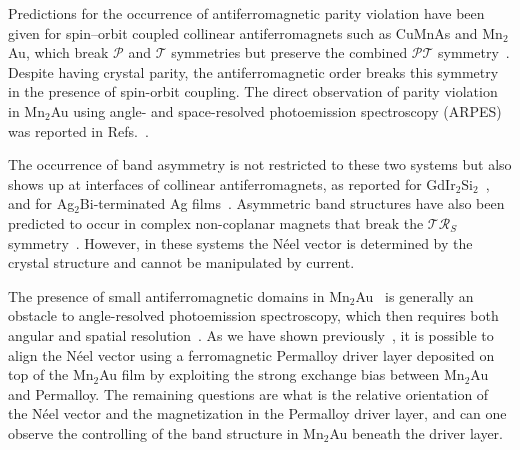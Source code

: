 \documentclass[aps,prb,twocolumn,superscriptaddress,10pt]{revtex4-1}
\begin{document}
Predictions for the occurrence of antiferromagnetic parity violation 
have been given for spin–orbit coupled collinear antiferromagnets such as CuMnAs and Mn$_2$Au, which break $\mathcal{P}$ and $\mathcal{T}$ symmetries but preserve the combined $\mathcal{PT}$ 
symmetry~\cite{Smejkal2017,Hayami2018,Watanabe2020,Elmers2020,Hayami2020}. 
Despite having crystal parity, the antiferromagnetic order
breaks this symmetry in the presence of spin-orbit coupling.
The direct observation of parity violation in Mn$_2$Au using 
angle- and space-resolved photoemission spectroscopy (ARPES) was reported in Refs.~.

The occurrence of band asymmetry is not restricted to these two systems but also
shows up at interfaces of collinear antiferromagnets, as reported for  GdIr$_2$Si$_2$~\cite{Schulz2021}, and for Ag$_2$Bi-terminated Ag films~\cite{Carbone2016}. 
Asymmetric band structures have also been predicted to occur in complex non-coplanar magnets that break the $\mathcal{TR}_{S}$ symmetry~\cite{Hayami2018}.
However, in these systems the N{\'e}el vector is determined by the crystal structure
and cannot be manipulated by current.

The presence of small antiferromagnetic domains in Mn$_2$Au~\cite{Sapozhnik2018,Bommanaboyena2021} is generally an obstacle to angle-resolved photoemission spectroscopy, which then requires both angular and spatial resolution~\cite{Fedchenko2022}. 
As we have shown previously~\cite{Bommanaboyena2021}, it is possible
to align the N{\'e}el vector using 
a ferromagnetic Permalloy driver layer deposited on top of the
Mn$_2$Au film by exploiting the strong exchange bias between Mn$_2$Au and Permalloy. 
The remaining questions are what is the relative orientation of the N{\'e}el vector and the magnetization in the Permalloy driver layer,
and can one observe the controlling of the band structure in Mn$_2$Au
beneath the driver layer.
\end{document}
